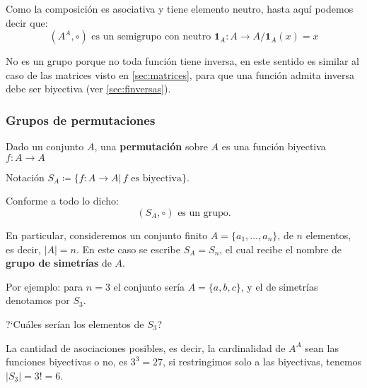 Como la composición es asociativa y tiene elemento neutro, hasta aquí podemos decir que:
\[ (A^A, \circ) \mbox{ es un semigrupo con neutro } \mathbf{1}_A: A \rightarrow A /  \mathbf{1}_A(x) = x \]

No es un grupo porque no toda función tiene inversa, en este sentido es similar al caso de las matrices visto en \ref{sec:matrices}, para que una función admita inversa debe ser biyectiva (ver \ref{sec:finversas}). 

\subsubsection{Grupos de permutaciones}

\begin{fmd-definition}[Permutación]
	Dado un conjunto $A$, una \textbf{permutación} sobre $A$ es una función biyectiva $f: A \rightarrow A$
\end{fmd-definition}

Notación $S_A \coloneqq \{ f: A \rightarrow A | \, f \mbox{ es biyectiva}\}$.

Conforme a todo lo dicho:
\[ (S_A, \circ ) \mbox{ es un grupo.}\]

En particular, consideremos un conjunto finito $A = \{ a_1, \dots, a_n \}$, de $n$ elementos, es decir, $|A| = n$. En este caso se escribe $S_A = S_n$, el cual recibe el nombre de \textbf{grupo de simetrías} de $A$.

Por ejemplo: para $n = 3$ el conjunto sería $A = \{a, b, c\}$, y el de simetrías denotamos por $S_3$.

?`Cuáles serían los elementos de $S_3$?

La cantidad de asociaciones posibles, es decir, la cardinalidad de $A^A$ sean las funciones biyectivas o no, es $3^3 = 27$, si restringimos solo a las biyectivas, tenemos $|S_3| = 3! = 6$.

